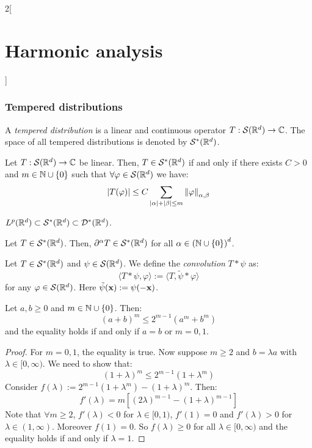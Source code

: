 \documentclass[../../../main_math.tex]{subfiles}
\begin{document}
\begin{multicols}{2}[\section{Harmonic analysis}]
  \subsubsection{Tempered distributions}
  \begin{definition}
    A \emph{tempered distribution} is a linear and continuous operator $T:\mathcal{S}(\mathbb{R}^d)\to \mathbb{C}$. The space of all tempered distributions is denoted by $\mathcal{S}^*(\mathbb{R}^d)$.
  \end{definition}
  \begin{lemma}
    Let $T:\mathcal{S}(\mathbb{R}^d)\to \mathbb{C}$ be linear. Then, $T\in\mathcal{S}^*(\mathbb{R}^d)$ if and only if there exists $C>0$ and $m\in\mathbb{N}\cup\{0\}$ such that $\forall \varphi\in \mathcal{S}(\mathbb{R}^d)$ we have:
    $$
      \abs{T(\varphi)}\leq C\sum_{\abs{\alpha}+\abs{\beta}\leq m}\left\|\varphi\right\|_{\alpha,\beta}
    $$
  \end{lemma}
  \begin{lemma}\label{HA:LpSD}
    $L^p(\mathbb{R}^d)\subset\mathcal{S}^*(\mathbb{R}^d)\subset \mathcal{D}^*(\mathbb{R}^d)$.
  \end{lemma}
  \begin{lemma}
    Let $T\in \mathcal{S}^*(\mathbb{R}^d)$. Then, $\partial^\alpha T\in \mathcal{S}^*(\mathbb{R}^d)$ for all $\alpha\in{(\ensuremath{\mathbb{N}}\cup\{0\})}^d$.
  \end{lemma}
  \begin{definition}
    Let $T\in \mathcal{S}^*(\mathbb{R}^d)$ and $\psi\in \mathcal{S}(\mathbb{R}^d)$. We define the \emph{convolution} $T*\psi$ as:
    $$
      \langle T*\psi,\varphi\rangle:=\langle T,\tilde\psi*\varphi\rangle
    $$
    for any $\varphi\in \mathcal{S}(\mathbb{R}^d)$. Here $\tilde\psi(\boldsymbol{\mathrm{x}}):=\psi(-\boldsymbol{\mathrm{x}})$.
  \end{definition}
  \begin{lemma}\label{HA:lemma_aMbM}
    Let $a,b\geq 0$ and $m\in\mathbb{N}\cup\{0\}$. Then:
    $$
      {(a+b)}^m\leq 2^{m-1}(a^m+b^m)
    $$
    and the equality holds if and only if $a=b$ or $m=0,1$.
  \end{lemma}
  \begin{proof}
    For $m=0,1$, the equality is true. Now suppose $m\geq 2$ and $b=\lambda a$ with $\lambda\in [0,\infty)$. We need to show that:
    $$
      {(1+\lambda)}^m\leq 2^{m-1}(1+\lambda^m)
    $$
    Consider $f(\lambda):=2^{m-1}(1+\lambda^m)-{(1+\lambda)}^m$. Then:
    $$
      f'(\lambda)=m\left[{(2\lambda)}^{m-1}-{(1+\lambda)}^{m-1}\right]
    $$
    Note that $\forall m\geq 2$, $f'(\lambda)<0$ for $\lambda\in[0,1)$, $f'(1)=0$ and $f'(\lambda)>0$ for $\lambda\in(1,\infty)$. Moreover $f(1)=0$. So $f(\lambda)\geq 0$ for all $\lambda\in [0,\infty)$ and the equality holds if and only if $\lambda=1$.

\end{proof}
\end{multicols}
\end{document}
